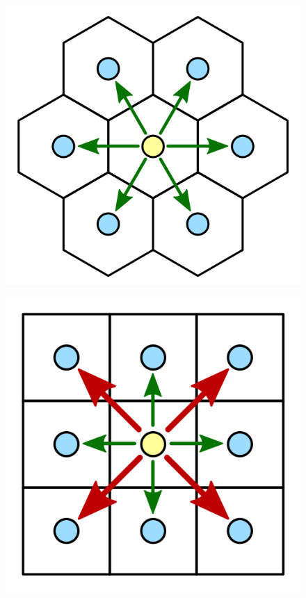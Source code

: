 \begin{figure}[h]
\centering
\includegraphics[scale=0.7]{kepek/image26.png}
\caption{}
\label{fig:image26}
\end{figure}

\begin{figure}[h]
\centering
\includegraphics[scale=0.7]{kepek/image27.png}
\caption{}
\label{fig:image27}
\end{figure}

